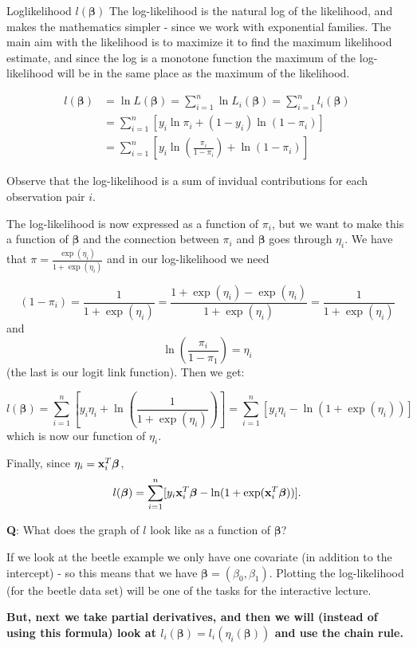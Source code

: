 \documentclass[
  ignorenonframetext,
]{beamer}
\begin{document}
\begin{frame}
\begin{block}{Loglikelihood \(l(\boldsymbol{\beta})\)}
\protect\hypertarget{loglikelihood-lboldsymbolbeta}{}
The log-likelihood is the natural log of the likelihood, and makes the
mathematics simpler - since we work with exponential families. The main
aim with the likelihood is to maximize it to find the maximum likelihood
estimate, and since the log is a monotone function the maximum of the
log-likelihood will be in the same place as the maximum of the
likelihood.

\begin{align}
l(\boldsymbol{\beta})&=\ln L(\boldsymbol{\beta})=\sum_{i=1}^n \ln L_i(\boldsymbol{\beta})=\sum_{i=1}^n l_i(\boldsymbol{\beta})\\
&=\sum_{i=1}^n[y_i \ln \pi_i+(1-y_i) \ln(1-\pi_i)]\\
&=\sum_{i=1}^n[y_i \ln (\frac{\pi_i}{1-\pi_i})+\ln(1-\pi_i)]
\end{align}

Observe that the log-likelihood is a sum of invidual contributions for
each observation pair \(i\).
\end{block}
\end{frame}

\begin{frame}
The log-likelihood is now expressed as a function of \(\pi_i\), but we
want to make this a function of \(\boldsymbol{\beta}\) and the
connection between \(\pi_i\) and \(\boldsymbol{\beta}\) goes through
\(\eta_i\). We have that \(\pi=\frac{\exp(\eta_i)}{1+\exp(\eta_i)}\) and
in our log-likelihood we need

\[(1-\pi_i)=\frac{1}{1+\exp(\eta_i)}=\frac{1+\exp(\eta_i)-\exp(\eta_i)}{1+\exp(\eta_i)}=\frac{1}{1+\exp(\eta_i)}\]
and \[\ln(\frac{\pi_i}{1-\pi_1})=\eta_i\] (the last is our logit link
function). Then we get:

\[l(\boldsymbol{\beta})=\sum_{i=1}^n[y_i \eta_i + \ln (\frac{1}{1+\exp(\eta_i)})]=\sum_{i=1}^n[y_i \eta_i - \ln (1+\exp(\eta_i))]\]
which is now our function of \(\eta_i\).
\end{frame}

\begin{frame}
Finally, since \(\eta_i={\bf x}_i^T \boldsymbol{\beta}\),
\[l(\boldsymbol{\beta})=\sum_{i=1}^n[y_i {\bf x}_i^T \boldsymbol{\beta} - \ln (1+\exp({\bf x}_i^T \boldsymbol{\beta}))].\]

\textbf{Q}: What does the graph of \(l\) look like as a function of
\(\boldsymbol{\beta}\)?

If we look at the beetle example we only have one covariate (in addition
to the intercept) - so this means that we have
\(\boldsymbol{\beta}=(\beta_0,\beta_1)\). Plotting the log-likelihood
(for the beetle data set) will be one of the tasks for the interactive
lecture.

\textbf{But, next we take partial derivatives, and then we will (instead
of using this formula) look at
\(l_i(\boldsymbol{\beta})=l_i(\eta_i(\boldsymbol{\beta}))\) and use the
chain rule.}
\end{frame}
\end{document}
